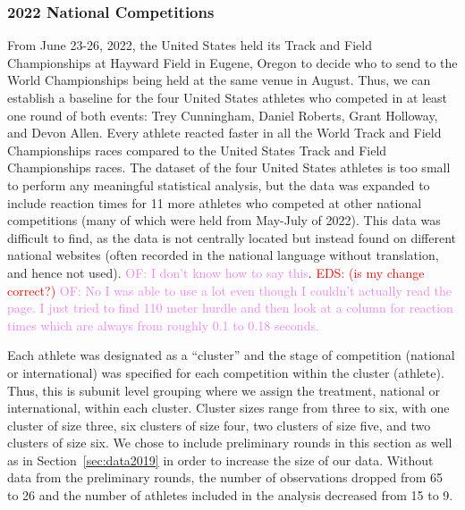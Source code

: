 \documentclass[12pt, letterpaper, titlepage]{article}
\newcommand{\eds}[1]{\textcolor{red}{EDS: (#1)}}
\newcommand{\of}[1]{\textcolor{violet}{OF: #1}}
\begin{document}
\subsubsection{2022 National Competitions}\label{sec:datanational}
From June 23-26, 2022, the United States held its Track and Field Championships 
at Hayward Field in Eugene, Oregon to decide who to send to the World 
Championships being held at the same venue in August. Thus, we can establish a 
baseline for the four United States athletes who competed in at least one round 
of both events: Trey Cunningham, Daniel Roberts, Grant Holloway, and Devon Allen.   
Every athlete reacted faster in all the World Track and Field Championships 
races compared to the United States Track and Field Championships races. The 
dataset of the four United States athletes is too small to perform any 
meaningful statistical analysis, but the data was expanded to include reaction 
times for 11 more athletes who competed at other national competitions (many of which were 
held from May-July of 2022). This data was difficult to find, as the data is not
centrally located but instead found on different national websites (often 
recorded in the national language without translation, and hence not used). 
\of{I don't know how to say this}. \eds{is my change correct?} \of{No I was able
to use a lot even though I couldn't actually read the page. I just tried to find
110 meter hurdle and then look at a column for reaction times which are always from
roughly 0.1 to 0.18 seconds.} 


Each athlete was designated as a ``cluster'' and the stage of competition (national
or international) was specified for each competition within the cluster (athlete).
Thus, this is subunit level grouping where we assign the treatment, national or
international, within each cluster.  Cluster sizes range from three to six, with
one cluster of size three, six clusters of size four, two clusters of size five,
and two clusters of size six.  We chose to include preliminary rounds in this
section as well as in Section~\ref{sec:data2019} in order to increase the size 
of our data.  Without data from the preliminary rounds, the number of observations
dropped from 65 to 26 and the number of athletes included in the analysis
decreased from 15 to 9.

\end{document}
